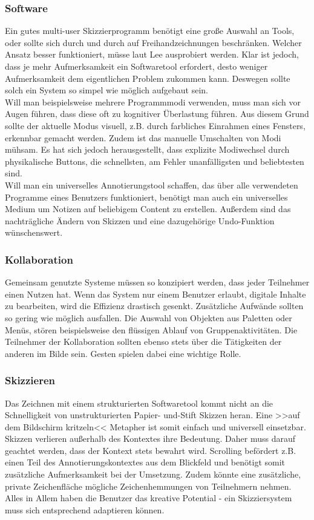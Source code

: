 \subsubsection*{Software} Ein gutes multi-user Skizzierprogramm benötigt eine große Auswahl an Tools, oder sollte sich durch und durch auf Freihandzeichnungen beschränken. Welcher Ansatz besser funktioniert, müsse laut Lee ausprobiert werden. Klar ist jedoch, dass je mehr Aufmerksamkeit ein Softwaretool erfordert, desto weniger Aufmerksamkeit dem eigentlichen Problem zukommen kann. Deswegen sollte solch ein System so simpel wie möglich aufgebaut sein. \\
Will man beispielsweise mehrere Programmmodi verwenden, muss man sich vor Augen führen, dass diese oft zu kognitiver Überlastung führen. Aus diesem Grund sollte der aktuelle Modus visuell, z.B. durch farbliches Einrahmen eines Fensters, erkennbar gemacht werden. Zudem ist das manuelle Umschalten von Modi mühsam. Es hat sich jedoch herausgestellt, dass explizite Modiwechsel durch physikalische Buttons, die schnellsten, am Fehler unanfälligsten und beliebtesten sind. \\
Will man ein universelles Annotierungstool schaffen, das über alle verwendeten Programme eines Benutzers funktioniert, benötigt man auch ein universelles Medium um Notizen auf beliebigem Content zu erstellen. Außerdem sind das nachträgliche Ändern von Skizzen und eine dazugehörige Undo-Funktion wünschenswert.

\subsubsection*{Kollaboration} Gemeinsam genutzte Systeme müssen so konzipiert werden, dass jeder Teilnehmer einen Nutzen hat. Wenn das System nur einem Benutzer erlaubt, digitale Inhalte zu bearbeiten, wird die Effizienz drastisch gesenkt. Zusätzliche Aufwände sollten so gering wie möglich ausfallen. Die Auswahl von Objekten aus Paletten oder Menüs, stören beispielsweise den flüssigen Ablauf von Gruppenaktivitäten. Die Teilnehmer der Kollaboration sollten ebenso stets über die Tätigkeiten der anderen im Bilde sein. Gesten spielen dabei eine wichtige Rolle.

\subsubsection*{Skizzieren} Das Zeichnen mit einem strukturierten Softwaretool kommt nicht an die Schnelligkeit von unstrukturierten Papier- und-Stift Skizzen heran. Eine >>auf dem Bildschirm kritzeln<< Metapher ist somit einfach und universell einsetzbar. Skizzen verlieren außerhalb des Kontextes ihre Bedeutung. Daher muss darauf geachtet werden, dass der Kontext stets bewahrt wird. Scrolling befördert z.B. einen Teil des Annotierungskontextes aus dem Blickfeld und benötigt somit zusätzliche Aufmerksamkeit bei der Umsetzung. Zudem könnte eine zusätzliche, private Zeichenfläche mögliche Zeichenhemmungen von Teilnehmern nehmen. Alles in Allem haben die Benutzer das kreative Potential - ein Skizziersystem muss sich entsprechend adaptieren können.

